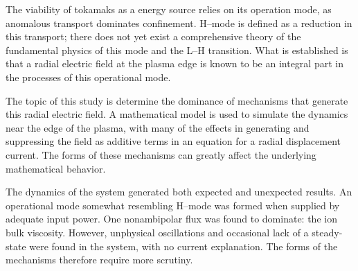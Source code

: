 
The viability of tokamaks as a energy source relies on its operation mode, as anomalous transport dominates confinement.
H--mode is defined as a reduction in this transport; there does not yet exist a comprehensive theory of the fundamental physics of this mode and the L--H transition.
What is established is that a radial electric field at the plasma edge is known to be an integral part in the processes of this operational mode.

The topic of this study is determine the dominance of mechanisms that generate this radial electric field.
A mathematical model is used to simulate the dynamics near the edge of the plasma, with many of the effects in generating and suppressing the field as additive terms in an equation for a radial displacement current.
The forms of these mechanisms can greatly affect the underlying mathematical behavior.

The dynamics of the system generated both expected and unexpected results.
An operational mode somewhat resembling H--mode was formed when supplied by adequate input power.
One nonambipolar flux was found to dominate: the ion bulk viscosity.
However, unphysical oscillations and occasional lack of a steady-state were found in the system, with no current explanation.
The forms of the mechanisms therefore require more scrutiny.

